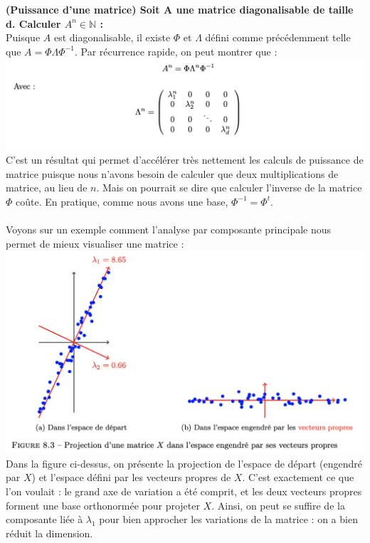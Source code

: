                     \\
                    \\
                    \textbf{(Puissance d’une matrice) Soit A une matrice diagonalisable de taille d. Calculer $A^n \in \mathbb{N}$ :}
                    \\
                    Puisque $A$ est diagonalisable, il existe $\Phi$ et $\Lambda$ défini comme précédemment telle que $A = \Phi \Lambda \Phi^{-1}$. Par récurrence rapide, on peut montrer que :
                    \\
                    \includegraphics[width=\linewidth]{./img/reduction_dim/pca/mat_puissance}
                    \\
                    C’est un résultat qui permet d’accélérer très nettement les calculs de puissance de matrice puisque nous n’avons besoin de calculer que deux multiplications de matrice, au lieu de $n$. Mais on pourrait se dire que calculer l’inverse de la matrice $\Phi$ coûte. En pratique, comme nous avons une base, $\Phi^{-1} = \Phi^t$.
                    \\
                    \\
                    Voyons sur un exemple comment l’analyse par composante principale nous permet de mieux visualiser une matrice :
                    \\
                    \includegraphics[width=\linewidth]{./img/reduction_dim/pca/graph_mat}
                    \\
                    Dans la figure ci-dessus, on présente la projection de l’espace de départ (engendré par $X$) et l’espace défini par les vecteurs propres de $X$. C’est exactement ce que l’on voulait : le grand axe de variation a été comprit, et les deux vecteurs propres forment une base orthonormée pour projeter $X$. Ainsi, on peut se suffire de la composante liée à $\lambda_1$ pour bien approcher les variations de la matrice : on a bien réduit la dimension.



